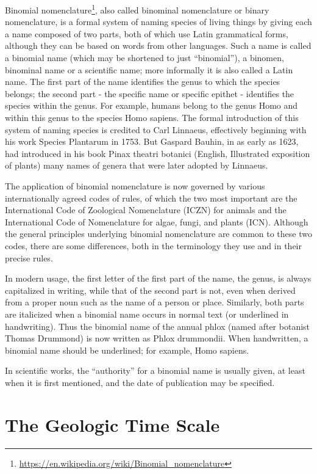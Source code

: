 \documentclass[]{book}
\let\rmarkdownfootnote\footnote%
\def\footnote{\protect\rmarkdownfootnote}
\renewcommand{\href}[2]{#2\footnote{\url{#1}}}
\theoremstyle{definition}
\theoremstyle{definition}
\theoremstyle{definition}
\theoremstyle{remark}
\begin{document}
\begin{enumerate}
\href{https://en.wikipedia.org/wiki/Binomial_nomenclature}{Binomial
nomenclature}, also called binominal nomenclature or binary
nomenclature, is a formal system of naming species of living things by
giving each a name composed of two parts, both of which use Latin
grammatical forms, although they can be based on words from other
languages. Such a name is called a binomial name (which may be shortened
to just ``binomial''), a binomen, binominal name or a scientific name;
more informally it is also called a Latin name. The first part of the
name identifies the genus to which the species belongs; the second part
- the specific name or specific epithet - identifies the species within
the genus. For example, humans belong to the genus Homo and within this
genus to the species Homo sapiens. The formal introduction of this
system of naming species is credited to Carl Linnaeus, effectively
beginning with his work Species Plantarum in 1753. But Gaspard Bauhin,
in as early as 1623, had introduced in his book Pinax theatri botanici
(English, Illustrated exposition of plants) many names of genera that
were later adopted by Linnaeus.

The application of binomial nomenclature is now governed by various
internationally agreed codes of rules, of which the two most important
are the International Code of Zoological Nomenclature (ICZN) for animals
and the International Code of Nomenclature for algae, fungi, and plants
(ICN). Although the general principles underlying binomial nomenclature
are common to these two codes, there are some differences, both in the
terminology they use and in their precise rules.

In modern usage, the first letter of the first part of the name, the
genus, is always capitalized in writing, while that of the second part
is not, even when derived from a proper noun such as the name of a
person or place. Similarly, both parts are italicized when a binomial
name occurs in normal text (or underlined in handwriting). Thus the
binomial name of the annual phlox (named after botanist Thomas Drummond)
is now written as Phlox drummondii. When handwritten, a binomial name
should be underlined; for example, Homo sapiens.

In scientific works, the ``authority'' for a binomial name is usually
given, at least when it is first mentioned, and the date of publication
may be specified.

\section{The Geologic Time Scale}\label{the-geologic-time-scale}


\end{enumerate}
\end{document}
